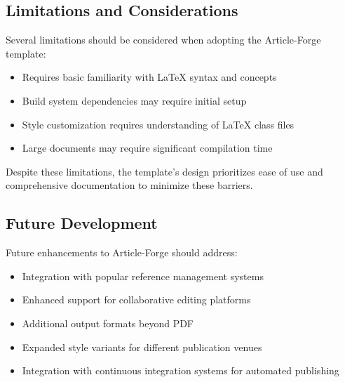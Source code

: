 \subsection{Limitations and Considerations}

Several limitations should be considered when adopting the Article-Forge template:

\begin{itemize}
    \item Requires basic familiarity with LaTeX syntax and concepts
    \item Build system dependencies may require initial setup
    \item Style customization requires understanding of LaTeX class files
    \item Large documents may require significant compilation time
\end{itemize}

Despite these limitations, the template's design prioritizes ease of use and comprehensive documentation to minimize these barriers.

\subsection{Future Development}

Future enhancements to Article-Forge should address:
\begin{itemize}
    \item Integration with popular reference management systems
    \item Enhanced support for collaborative editing platforms
    \item Additional output formats beyond PDF
    \item Expanded style variants for different publication venues
    \item Integration with continuous integration systems for automated publishing
\end{itemize}
